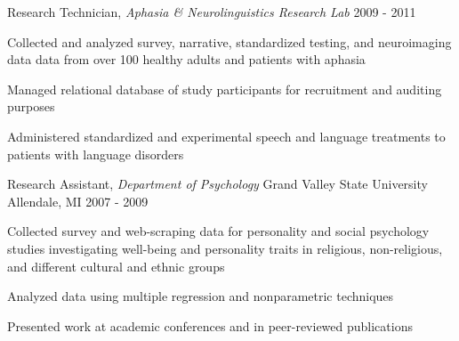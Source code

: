 \begin{cventries}
  \cventry
    {Research Technician, \textit{Aphasia \& Neurolinguistics Research Lab}} %
    {} %
    {} %
    {2009 - 2011} %
    {
      \begin{cvitems} %
        \item {Collected and analyzed survey, narrative, standardized testing, and neuroimaging data data from over 100 healthy adults and patients with aphasia}
        \item {Managed relational database of study participants for recruitment and auditing purposes}
        \item {Administered standardized and experimental speech and language treatments to patients with language disorders}
      \end{cvitems}
    }

  \cventry
    {Research Assistant, \textit{Department of Psychology}} %
    {Grand Valley State University} %
    {Allendale, MI} %
    {2007 - 2009} %
    {
      \begin{cvitems} %
        \item {Collected survey and web-scraping data for personality and social psychology studies investigating well-being and personality traits in religious, non-religious, and different cultural and ethnic groups}
        \item {Analyzed data using multiple regression and nonparametric techniques}
        \item {Presented work at academic conferences and in peer-reviewed publications}
      \end{cvitems}
    }

\end{cventries}
